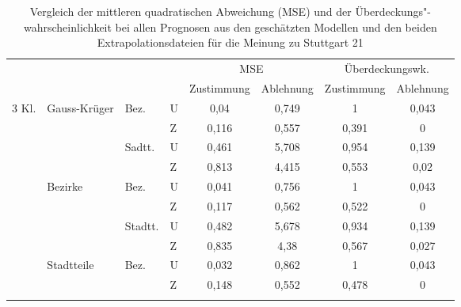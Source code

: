 \documentclass{Vorlage}
\begin{document}
\begin{table}[h]
\centering
\caption{Vergleich der mittleren quadratischen Abweichung (MSE) und der Überdeckungs"-wahrscheinlichkeit bei allen Prognosen aus den geschätzten Modellen und den beiden Extrapolationsdateien für die Meinung zu Stuttgart 21}
\label{vali}
\begin{tabular}{llll|cc|cc}
\hline \hline
                        &                               &                          &   & \multicolumn{2}{c|}{MSE} & \multicolumn{2}{c}{Überdeckungswk.} \\
                        &                               &                          &   & Zustimmung  & Ablehnung  & Zustimmung        & Ablehnung       \\ \hline
\multirow{12}{*}{3 Kl.} & \multirow{4}{*}{Gauss-Krüger} & \multirow{2}{*}{Bez.}    & U & 0,04        & 0,749      & 1                 & 0,043           \\
                        &                               &                          & Z & 0,116       & 0,557      & 0,391             & 0               \\ \cline{3-8} 
                        &                               & \multirow{2}{*}{Sadtt.}  & U & 0,461       & 5,708      & 0,954             & 0,139           \\
                        &                               &                          & Z & 0,813       & 4,415      & 0,553             & 0,02            \\ \cline{2-8} 
                        & \multirow{4}{*}{Bezirke}      & \multirow{2}{*}{Bez.}    & U & 0,041       & 0,756      & 1                 & 0,043           \\
                        &                               &                          & Z & 0,117       & 0,562      & 0,522             & 0               \\ \cline{3-8} 
                        &                               & \multirow{2}{*}{Stadtt.} & U & 0,482       & 5,678      & 0,934             & 0,139           \\
                        &                               &                          & Z & 0,835       & 4,38       & 0,567             & 0,027           \\ \cline{2-8} 
                        & \multirow{4}{*}{Stadtteile}   & \multirow{2}{*}{Bez.}    & U & 0,032      & 0,862     &      1             &   0,043          \\
                        &                               &                          & Z & 0,148       & 0,552      &     0,478         &     0 \\ \cline{3-8} 

\end{tabular}
\end{table}
\end{document}
